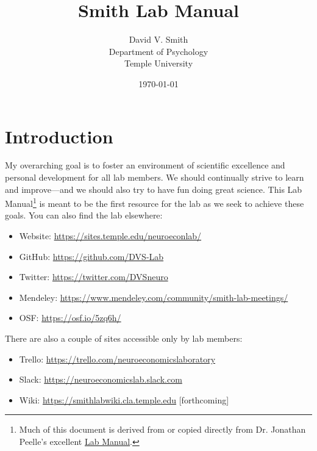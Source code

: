 \documentclass[letterpaper,12pt,oneside]{memoir}
\begin{document}
\title{Smith Lab Manual}
\author{David V. Smith\\Department of Psychology\\Temple University}
\date{\today}


\maketitle

\pagestyle{titlingpage}


\cleardoublepage
\frontmatter
\tableofcontents
\cleardoublepage

\mainmatter

\pagestyle{headings}

\chapter{Introduction}

My overarching goal is to foster an environment of scientific excellence and personal development for all lab members. We should continually strive to learn and improve---and we should also try to have fun doing great science. This Lab Manual\footnote{Much of this document is derived from or copied directly from Dr. Jonathan Peelle's excellent \href{https://github.com/jpeelle/peellelab\_manual/}{Lab Manual}.} is meant to be the first resource for the lab as we seek to achieve these goals. You can also find the lab elsewhere:

\begin{itemize}[noitemsep]
\item Website: \url{https://sites.temple.edu/neuroeconlab/}
\item GitHub: \url{https://github.com/DVS-Lab}
\item Twitter: \url{https://twitter.com/DVSneuro}
\item Mendeley: \url{https://www.mendeley.com/community/smith-lab-meetings/} 
\item OSF: \url{https://osf.io/5zq6h/}
\end{itemize}

\noindent There are also a couple of sites accessible only by lab members:

\begin{itemize}[noitemsep]
\item Trello: \url{https://trello.com/neuroeconomicslaboratory}
\item Slack: \url{https://neuroeconomicslab.slack.com}
\item Wiki: \url{https://smithlabwiki.cla.temple.edu} [forthcoming]
\end{itemize}
\end{document}
